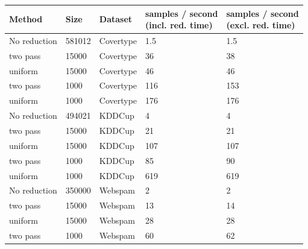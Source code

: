 \begin{table}[t!]
    \centering
    \begin{tabular}{ l | l| l| l| l}
        \hline
        \textbf{Method} & \textbf{Size} & \textbf{Dataset} & \makecell{\textbf{samples / second}       \\ \textbf{(incl. red. time)}} & \makecell{\textbf{samples / second} \\ \textbf{(excl. red. time)}}\\ \hline
        No reduction    & 581012        & Covertype        & 1.5                                 & 1.5 \\ \hline
        two pass        & 15000         & Covertype        & 36                                  & 38  \\ \hline
        uniform         & 15000         & Covertype        & 46                                  & 46  \\ \hline
        two pass        & 1000          & Covertype        & 116                                 & 153 \\ \hline
        uniform         & 1000          & Covertype        & 176                                 & 176 \\ \hline
        No reduction    & 494021        & KDDCup           & 4                                   & 4   \\ \hline
        two pass        & 15000         & KDDCup           & 21                                  & 21  \\ \hline
        uniform         & 15000         & KDDCup           & 107                                 & 107 \\ \hline
        two pass        & 1000          & KDDCup           & 85                                  & 90  \\ \hline
        uniform         & 1000          & KDDCup           & 619                                 & 619 \\ \hline
        No reduction    & 350000        & Webspam          & 2                                   & 2   \\ \hline
        two pass        & 15000         & Webspam          & 13                                  & 14  \\ \hline
        uniform         & 15000         & Webspam          & 28                                  & 28  \\ \hline
        two pass        & 1000          & Webspam          & 60                                  & 62  \\ \hline

\end{tabular}
\end{table}
